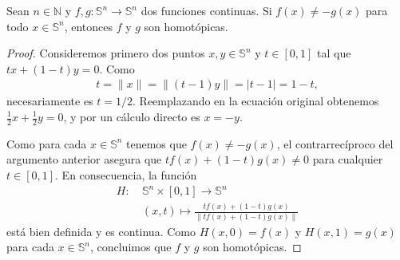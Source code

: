 \documentclass[11pt]{article}
\newcommand{\N}{\mathbb{N}}
\newcommand{\Ss}{\mathbb{S}}
\newcommand{\paint}[1]{\color{color}{#1}}
\newenvironment{lemma}[2][Lema]{\begin{trivlist}
\item[\hskip \labelsep \paint{{\bfseries #1}}\hskip \labelsep {\bfseries #2.}]}{\end{trivlist}}
\begin{document}
\begin{lemma}{4} Sean $n \in \N$ y $f,g : \Ss^n \to \Ss^n$ dos funciones continuas. Si $f(x) \neq -g(x)$ para todo $x \in \Ss^n$, entonces $f$ y $g$ son homot\'opicas.
\end{lemma}
\begin{proof} Consideremos primero dos puntos $x,y \in \Ss^n$ y $t \in [0,1]$  tal que $tx + (1-t)y = 0$. Como 
\begin{align*}
t = \|x\| = \|(t-1)y\| = |t-1| = 1-t,
\end{align*}
necesariamente es $t = 1/2$. Reemplazando en la ecuaci\'on original obtenemos $\frac{1}{2}x + \frac{1}{2}y = 0$, y por un c\'alculo directo es $x = -y$. 

Como para cada $x \in \Ss^n$ tenemos que $f(x) \neq -g(x)$, el contrarrec\'iproco del argumento anterior asegura que $tf(x) + (1-t)g(x) \neq 0$ para cualquier $t \in [0,1]$. En consecuencia, la funci\'on
\begin{align*}
H : \ &\Ss^n \times [0,1] \longrightarrow \Ss^n \\
&(x,t) \mapsto \frac{tf(x) + (1-t)g(x)}{\|tf(x) + (1-t)g(x)\|}
\end{align*}
est\'a bien definida y es continua. Como $H(x,0) = f(x)$ y $H(x,1) = g(x)$ para cada $x \in \Ss^n$, concluimos que $f$ y $g$ son homot\'opicas.
\end{proof}
\end{document}
